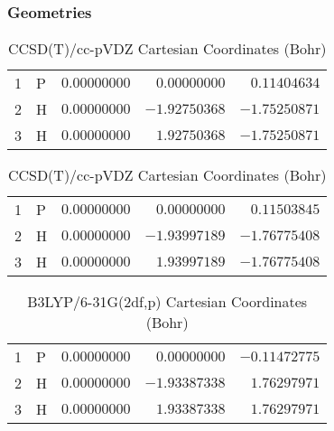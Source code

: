 \documentclass[10pt,oneside]{article}
\begin{document}
\clearpage

\subsection{}

\begin{table}[h!]
\subsubsection*{Geometries}
\begin{multicols}{2}
\centering
\caption{CCSD(T)/cc-pVTZ Cartesian Coordinates (Bohr)}
\begin{tabular}{llrrr}
\toprule
1  & P  & $ 0.00000000$ & $ 0.00000000$ & $ 0.11404634$ \\
2  & H  & $ 0.00000000$ & $-1.92750368$ & $-1.75250871$ \\
3  & H  & $ 0.00000000$ & $ 1.92750368$ & $-1.75250871$ \\
\bottomrule
\end{tabular}
\caption{CCSD(T)/cc-pVDZ Cartesian Coordinates (Bohr)}
\begin{tabular}{llrrr}
\toprule
1  & P  & $ 0.00000000$ & $ 0.00000000$ & $ 0.11503845$ \\
2  & H  & $ 0.00000000$ & $-1.93997189$ & $-1.76775408$ \\
3  & H  & $ 0.00000000$ & $ 1.93997189$ & $-1.76775408$ \\
\bottomrule
\end{tabular}
\end{multicols}
\end{table}

\begin{table}[h]
\centering
\caption{B3LYP/6-31G(2df,p) Cartesian Coordinates (Bohr)}
\begin{tabular}{llrrr}
\toprule
1  & P  & $ 0.00000000$ & $ 0.00000000$ & $-0.11472775$ \\
2  & H  & $ 0.00000000$ & $-1.93387338$ & $ 1.76297971$ \\
3  & H  & $ 0.00000000$ & $ 1.93387338$ & $ 1.76297971$ \\
\bottomrule
\end{tabular}
\end{table}
\end{document}
